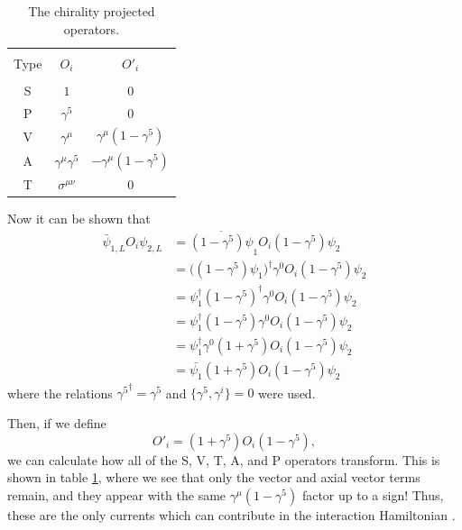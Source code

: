 \begin{table}[h]
  \caption{The chirality projected operators.} 
  \centering
  \begin{tabular}{c c c }
    \hline \hline \\ [-1.75ex]
    Type & $O_i$ & $O'_i$ \\ [0.50ex]
    \hline \\ 
    S & $1$ & 0 \\ [0.50ex]
    P & $\gamma^5$ & 0 \\ [0.50ex]
    V & $\gamma^{\mu}$ & $\gamma^\mu(1-\gamma^5)$ \\ [0.50ex]
    A & $\gamma^{\mu}\gamma^5$ & $-\gamma^\mu(1-\gamma^5)$ \\ [0.50ex]
    T & $\sigma^{\mu\nu}$ & 0 \\ [0.50ex]   
    \hline
  \end{tabular}
  \label{tab:operatorPrime}
\end{table}

Now it can be shown that
%
\begin{align*}
  \bar{\psi}_{1,L} O_i \psi_{2,L} &= \overline{(1-\gamma^5)\psi}_{1} O_i (1-\gamma^5)\psi_{2} \\
  &= \Big((1-\gamma^5)\psi_{1}\Big)^\dagger \gamma^0 O_i (1-\gamma^5)\psi_{2} \\
  &= \psi^\dagger_{1}(1-\gamma^5)^\dagger \gamma^0 O_i (1-\gamma^5)\psi_{2} \\
  &= \psi^\dagger_{1}(1-\gamma^5) \gamma^0 O_i (1-\gamma^5)\psi_{2} \\
  &= \psi^\dagger_{1}\gamma^0(1+\gamma^5) O_i (1-\gamma^5)\psi_{2} \\
  &= \bar{\psi_{1}}(1+\gamma^5) O_i (1-\gamma^5)\psi_{2} 
\end{align*}
%
where the relations ${\gamma^5}^\dagger = \gamma^5$ and $\{\gamma^5,\gamma^i\}=0$ were used.

Then, if we define
\begin{equation*}
  O'_i = (1+\gamma^5) O_i (1-\gamma^5),
\end{equation*}
we can calculate how all of the S, V, T, A, and P operators transform. This is shown in table
\ref{tab:operatorPrime}, where we see that only the vector and axial vector terms remain, and they
appear with the same $\gamma^\mu(1-\gamma^5)$ factor up to a sign! Thus, these are the only
currents which can contribute in the interaction Hamiltonian \cite{greiner1996}.



